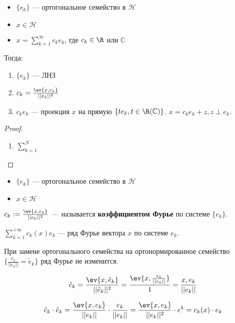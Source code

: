 \begin{theorem}\itemfix
    \begin{itemize}
        \item \(\{e_k\}\) --- ортогональное семейство в \(\mathcal{H}\)
        \item \(x \in \mathcal{H}\)
        \item \(x = \sum_{k = 1}^{\overline{\infty}} c_k e_k\), где \(c_k \in \R\) или \(\mathbb{C}\)
    \end{itemize}

    Тогда:
    \begin{enumerate}
        \item \(\{e_k\}\) --- ЛНЗ
        \item \(c_k = \frac{\ev{x, e_k}}{||e_k||^2}\)
        \item \(c_k e_k\) --- проекция \(x\) на прямую \(\{t e_k, t \in \R (\mathbb{C})\}\). \(x = c_k e_k + z, z \perp e_k\).
    \end{enumerate}
\end{theorem}
\begin{proof}\itemfix
    \begin{enumerate}
        \item \(\sum_{k = 1}^N\) \unfinished %
    \end{enumerate}
\end{proof}

\begin{definition}\itemfix
    \begin{itemize}
        \item \(\{e_k\}\) --- ортогональное семейство в \(\mathcal{H}\)
        \item \(x \in \mathcal{H}\)
    \end{itemize}
    \(c_k := \frac{\ev{x, e_k}}{||e_k||^2}\) --- называется \textbf{коэффициентом Фурье} по системе \(\{e_k\}\).

    \(\sum_{k = 1}^{+\infty} c_k(x) e_k\) --- ряд Фурье вектора \(x\) по системе \(e_k\).
\end{definition}

\begin{remark}
    При замене ортогонального семейства на ортонормированное семейство \(\{\frac{e_k}{||e_k||} = \tilde{e}_k\}\) ряд Фурье не изменится.

    \[\tilde{c}_k = \frac{\ev{x, \tilde{e}_k}}{||\tilde{e}_k||^2} = \frac{\ev{x, \frac{e_k}{||e_k||}}}{1} = \frac{x, e_k}{||e_k||}\]

    \[\tilde{c}_k \cdot \tilde{e}_k = \frac{\ev{x, e_k}}{||e_k||} \cdot \frac{e_k}{||e_k||} = \frac{\ev{x, e_k}}{||e_k||^2} \cdot e^k = c_k(x) \cdot e_k\]
\end{remark}

